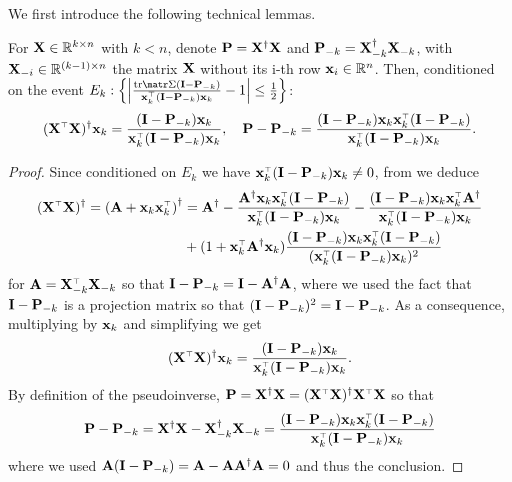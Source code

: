 \documentclass[../../thesis.tex]{subfiles}
\begin{document}
We first introduce the following technical lemmas.

\begin{lemma}\label{l:rank-one-update}
  For $\mathbf X \in \mathbb R^{k \times n}$ with $k<n$, denote $\mathbf P = \mathbf X^\dagger \mathbf X$ and $\mathbf P_{-k} = \mathbf X_{-k}^\dagger \mathbf X_{-k}$, with $\mathbf X_{-i} \in \mathbb R^{(k-1) \times n}$ the matrix $\mathbf X$ without its i-th row $\mathbf x_i \in \mathbb R^n$. Then, conditioned on the event $E_k: \left\{ \left| \frac{\tr \Sigmab (\I - \P_{-k})}{\x_k^\top (\I - \P_{-k}) \x_k} - 1 \right| \le \frac12 \right\}$:
  \begin{align*}
    (\X^\top\X)^\dagger\x_k = \frac{(\I - \P_{-k}) \x_k}{\x_k^\top (\I - \P_{-k}) \x_k}, \quad \P - \P_{-k} = \frac{(\I - \P_{-k}) \x_k \x_k^\top (\I - \P_{-k}) }{\x_k^\top (\I - \P_{-k}) \x_k}.
  \end{align*}
\end{lemma}

\begin{proof}
  Since conditioned on $E_k$ we have $\x_k^\top (\I - \P_{-k}) \x_k \neq 0$, from \cite[Theorem 1]{10.2307/2099767} we deduce
  \begin{align*}
    (\X^\top \X)^\dag = \left( \A + \x_k \x_k^\top \right)^\dagger
     & = \A^\dag
    - \frac{\A^\dag \x_k \x_k^\top (\I - \P_{-k}) }{\x_k^\top ( \I - \P_{-k}) \x_k}
    - \frac{( \I -\P_{-k}) \x_k \x_k^\top \A^\dag}{\x_k^\top ( \I - \P_{-k}) \x_k}                                           \\
     & + (1 + \x_k^\top \A^\dag \x_k) \frac{(\I - \P_{-k}) \x_k \x_k^\top (\I - \P_{-k})}{(\x_k^\top (\I - \P_{-k}) \x_k)^2}
  \end{align*}
  for $\A = \X_{-k}^\top \X_{-k}$ so that $\mathbf I - \mathbf P_{-k} = \mathbf I - \mathbf A^\dagger \mathbf A$, where we used the fact that $\mathbf I - \mathbf P_{-k}$ is a projection matrix so that $(\mathbf I - \mathbf P_{-k})^2 = \mathbf I - \mathbf P_{-k}$. As a consequence, multiplying by $\mathbf x_k$ and simplifying we get
  \[
    (\X^\top \X)^\dag \x_k = \frac{ ( \I -\P_{-k}) \x_k}{\x_k^\top (\I - \P_{-k}) \x_k}.
  \]
  By definition of the pseudoinverse, $\P = \X^\dagger \X = (\X^\top \X)^\dagger \X^\top \X$ so that
  \[
    \P - \P_{-k} = \X^\dagger \X - \X_{-k}^\dagger \X_{-k} = \frac{( \I - \P_{-k}) \x_k \x_k^\top ( \I - \P_{-k})}{\x_k^\top ( \I - \P_{-k}) \x_k}
  \]
  where we used $\mathbf A (\mathbf I - \mathbf P_{-k}) = \mathbf A - \mathbf A \mathbf A^\dagger \mathbf A = 0$ and thus the conclusion.
\end{proof}
\end{document}

